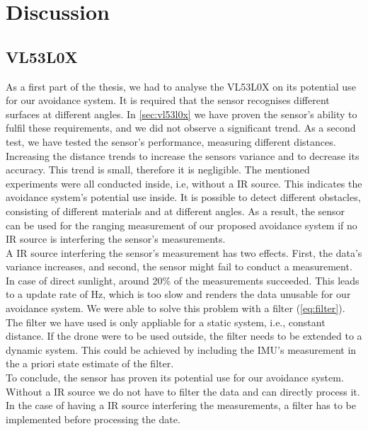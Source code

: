 \chapter{Discussion}

\section{VL53L0X}
As a first part of the thesis, we had to analyse the VL53L0X on its potential use for our avoidance system. It is required that the sensor recognises different surfaces at different angles. In \cref{sec:vl53l0x} we have proven the sensor's ability to fulfil these requirements, and we did not observe a significant trend. As a second test, we have tested the sensor's performance, measuring different distances. Increasing the distance trends to increase the sensors variance and to decrease its accuracy. This trend is small, therefore it is negligible. The mentioned experiments were all conducted inside, i.e, without a IR source. This indicates the avoidance system's potential use inside. It is possible to detect different obstacles, consisting of different materials and at different angles. As a result, the sensor can be used for the ranging measurement of our proposed avoidance system if no IR source is interfering the sensor's measurements. \\
A IR source interfering the sensor's measurement has two effects. First, the data's variance increases, and second, the sensor might fail to conduct a measurement. In case of direct sunlight, around 20\% of the measurements succeeded. This leads to a update rate of \unit[1]{Hz}, which is too slow and renders the data unusable for our avoidance system. We were able to solve this problem with a filter (\cref{eq:filter}). The filter we have used is only appliable for a static system, i.e., constant distance. If the drone were to be used outside, the filter needs to be extended to a dynamic system. This could be achieved by including the IMU's measurement in the a priori state estimate of the filter. \\
To conclude, the sensor has proven its potential use for our avoidance system. Without a IR source we do not have to filter the data and can directly process it. In the case of having a IR source interfering the measurements, a filter has to be implemented before processing the date.  
